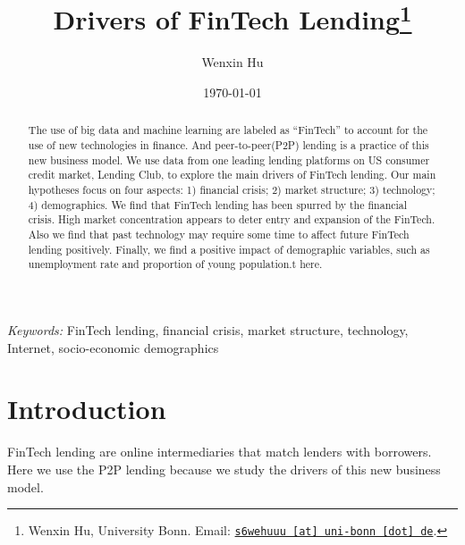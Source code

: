 \documentclass[11pt, a4paper, leqno]{article}
\begin{document}
\title{Drivers of FinTech Lending\thanks{Wenxin Hu, University Bonn. Email: \href{mailto:s6wehuuu@uni-bonn.de}{\nolinkurl{s6wehuuu [at] uni-bonn [dot] de}}.}}

\author{Wenxin Hu}

\date{
\today
}

\maketitle

\begin{abstract}
\noindent
The use of big data and machine learning are labeled as “FinTech” to account for the use of new technologies in finance. And peer-to-peer(P2P) lending is a practice of this new business model. We use data from one leading lending platforms on US consumer credit market, Lending Club, to explore the main drivers of FinTech lending. Our main hypotheses focus on four aspects: 1) financial crisis; 2) market structure; 3) technology; 4) demographics. We find that FinTech lending has been spurred by the financial crisis. High market concentration appears to deter entry and expansion of the FinTech. Also we find that past technology may require some time to affect future FinTech lending positively. Finally, we find a positive impact of demographic variables, such as unemployment rate and proportion of young population.t here.
\end{abstract}
\vspace{0.5cm}
\textit{Keywords:} FinTech lending, financial crisis, market structure, technology, Internet, socio-economic demographics


\newpage
\tableofcontents
\newpage
\listoffigures
\newpage
\listoftables
\newpage


\section{Introduction}


FinTech lending are online intermediaries that match lenders with borrowers. Here we use the P2P lending because we study the drivers of this new business model.
\end{document}
